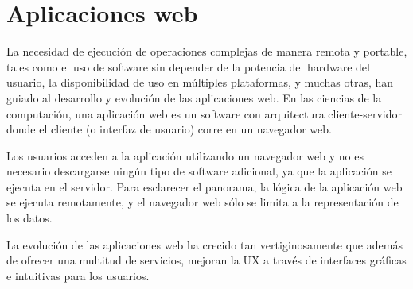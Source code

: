 \section{Aplicaciones web}
La necesidad de ejecución de operaciones complejas de manera remota y portable, tales como el uso de software sin depender de la potencia del hardware del usuario, la disponibilidad de uso en múltiples plataformas, y muchas otras, han guiado al desarrollo y evolución de las aplicaciones web. En las ciencias de la computación, una aplicación web es un software con arquitectura cliente-servidor donde el cliente (o interfaz de usuario) corre en un navegador web\citep{net_app_architecture}.

Los usuarios acceden a la aplicación utilizando un navegador web y no es necesario descargarse ningún tipo de software adicional, ya que la aplicación se ejecuta en el servidor. Para esclarecer el panorama, la lógica de la aplicación web se ejecuta remotamente, y el navegador web sólo se limita a la representación de los datos.

La evolución de las aplicaciones web ha crecido tan vertiginosamente que además de ofrecer una multitud de servicios, mejoran la UX a través de interfaces gráficas e intuitivas para los usuarios\citep{myers_past_2009}.